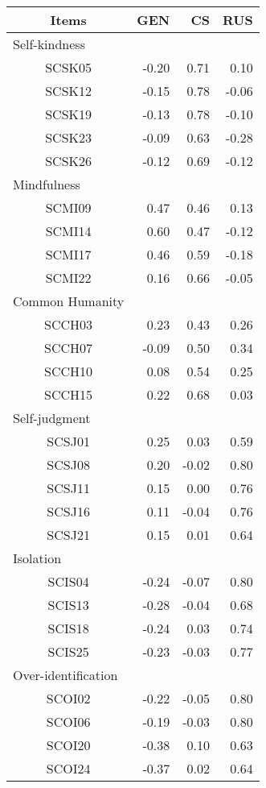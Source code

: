 \captionsetup[table]{labelformat=empty,skip=1pt}
\begin{longtable}{crrr}
\toprule
Items & GEN & CS & RUS \\ 
\midrule
\multicolumn{1}{l}{Self-kindness} \\ 
\midrule
SCSK05 & -0.20 & 0.71 & 0.10 \\ 
SCSK12 & -0.15 & 0.78 & -0.06 \\ 
SCSK19 & -0.13 & 0.78 & -0.10 \\ 
SCSK23 & -0.09 & 0.63 & -0.28 \\ 
SCSK26 & -0.12 & 0.69 & -0.12 \\ 
\midrule
\multicolumn{1}{l}{Mindfulness} \\ 
\midrule
SCMI09 & 0.47 & 0.46 & 0.13 \\ 
SCMI14 & 0.60 & 0.47 & -0.12 \\ 
SCMI17 & 0.46 & 0.59 & -0.18 \\ 
SCMI22 & 0.16 & 0.66 & -0.05 \\ 
\midrule
\multicolumn{1}{l}{Common Humanity} \\ 
\midrule
SCCH03 & 0.23 & 0.43 & 0.26 \\ 
SCCH07 & -0.09 & 0.50 & 0.34 \\ 
SCCH10 & 0.08 & 0.54 & 0.25 \\ 
SCCH15 & 0.22 & 0.68 & 0.03 \\ 
\midrule
\multicolumn{1}{l}{Self-judgment} \\ 
\midrule
SCSJ01 & 0.25 & 0.03 & 0.59 \\ 
SCSJ08 & 0.20 & -0.02 & 0.80 \\ 
SCSJ11 & 0.15 & 0.00 & 0.76 \\ 
SCSJ16 & 0.11 & -0.04 & 0.76 \\ 
SCSJ21 & 0.15 & 0.01 & 0.64 \\ 
\midrule
\multicolumn{1}{l}{Isolation} \\ 
\midrule
SCIS04 & -0.24 & -0.07 & 0.80 \\ 
SCIS13 & -0.28 & -0.04 & 0.68 \\ 
SCIS18 & -0.24 & 0.03 & 0.74 \\ 
SCIS25 & -0.23 & -0.03 & 0.77 \\ 
\midrule
\multicolumn{1}{l}{Over-identification} \\ 
\midrule
SCOI02 & -0.22 & -0.05 & 0.80 \\ 
SCOI06 & -0.19 & -0.03 & 0.80 \\ 
SCOI20 & -0.38 & 0.10 & 0.63 \\ 
SCOI24 & -0.37 & 0.02 & 0.64 \\ 
\bottomrule
\end{longtable}

